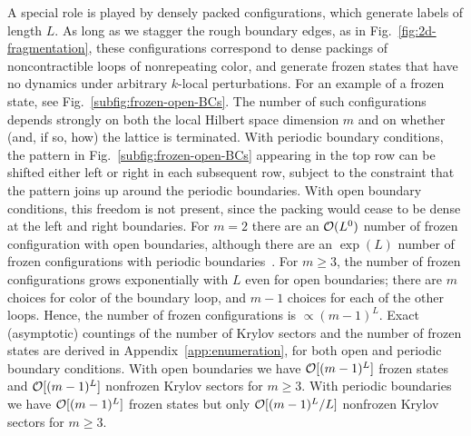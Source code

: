 A special role is played by densely packed configurations, which generate labels of length $L$. 
As long as we stagger the rough boundary edges, as in Fig.~\ref{fig:2d-fragmentation},
these configurations correspond to dense packings of noncontractible loops of nonrepeating color, and generate frozen states that have no dynamics under arbitrary $k$-local perturbations. For an example of a frozen state, see Fig.~\ref{subfig:frozen-open-BCs}. The number of such configurations depends strongly on both the local Hilbert space dimension $m$ and on whether (and, if so, how) the lattice is terminated. With periodic boundary conditions, the pattern in Fig.~\ref{subfig:frozen-open-BCs} appearing in the top row can be shifted either left or right in each subsequent row, subject to the constraint that the pattern joins up around the periodic boundaries. With open boundary conditions, this freedom is not present, since the packing would cease to be dense at the left and right boundaries. For $m=2$ there are an $\cal{O}(L^0)$ number of frozen configuration with open boundaries, although there are an $\exp(L)$ number of frozen configurations with periodic boundaries~\cite{Stephen2022Robust}. For $m\ge3$, the number of frozen configurations grows exponentially with $L$ even for open boundaries; there are $m$ choices for color of the boundary loop, and $m-1$ choices for each of the other loops. Hence, the number of frozen configurations is $\propto(m-1)^L$. Exact (asymptotic) countings of the number of Krylov sectors and the number of frozen states are derived in  Appendix~\ref{app:enumeration}, for both open and periodic boundary conditions. With open boundaries we have $\cal{O}[(m-1)^L]$ frozen states and $\cal{O}[(m-1)^L]$ nonfrozen Krylov sectors for $m\ge 3$. With periodic boundaries we have $\cal{O}[(m-1)^L]$ frozen states but only $\cal{O}[(m-1)^L/L]$ nonfrozen Krylov sectors for $m\ge 3$. 

